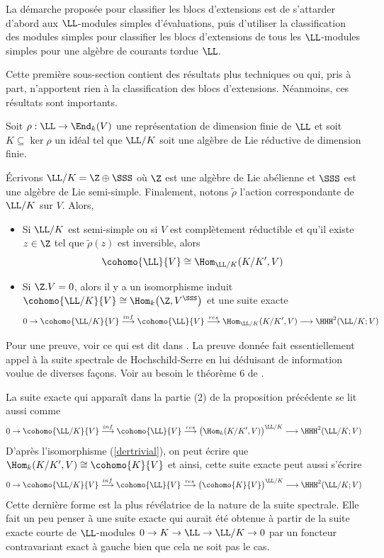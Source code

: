 La démarche proposée pour classifier les blocs d'extensions est de s'attarder d'abord aux $\LL$-modules simples d'évaluations, puis d'utiliser la classification des modules simples pour classifier les blocs d'extensions de tous les $\LL$-modules simples pour une algèbre de courants tordue $\LL$.

Cette première sous-section contient des résultats plus techniques ou qui, pris à part, n'apportent rien à la classification des blocs d'extensions. Néanmoins, ces résultats sont importants.  

\begin{Prop} \label{suitespectrale} Soit $\rho : \LL \rightarrow \End_k(V)$ une représentation de dimension finie de $\LL$ et soit $K \subseteq \ker \rho$ un idéal tel que $\LL/K$ soit une algèbre de Lie réductive de dimension finie. 

Écrivons $\LL/K = \Z \oplus \SSS$ où $\Z$ est une algèbre de Lie abélienne et $\SSS$ est une algèbre de Lie semi-simple. Finalement, notons $\tilde{\rho}$ l'action correspondante de $\LL/K$ sur $V$. Alors,

\begin{itemize}
\item[\em(1)] Si $\LL/K$ est semi-simple ou si $V$ est complètement réductible et qu'il existe $z \in \Z$ tel que $\tilde{\rho}(z)$ est inversible, alors
$$ \cohomo{\LL}{V} \cong \Hom_{\LL/K}(K/K',V) $$
\item[\em(2)] Si $\Z.V = 0$, alors il y a un isomorphisme induit $\cohomo{\LL/K}{V} \cong \Hom_k\big(\Z,V^\SSS\big)$ et une suite exacte
$$ 0 \rightarrow \cohomo{\LL/K}{V} \stackrel{inf}{\longrightarrow} \cohomo{\LL}{V} \stackrel{res}{\longrightarrow} \Hom_{\LL/K}(K/K',V) \longrightarrow \HHH^2(\LL/K;V) $$
\end{itemize}
\end{Prop}

Pour une preuve, voir ce qui est dit dans \cite{NSext}. La preuve donnée fait essentiellement appel à la suite spectrale de Hochschild-Serre en lui déduisant de information voulue de diverses façons. Voir au besoin le théorème 6 de \cite{HSlie}.

\begin{Rem} La suite exacte qui apparaît dans la partie (2) de la proposition précédente se lit aussi comme
$$ 0 \rightarrow \cohomo{\LL/K}{V} \stackrel{inf}{\longrightarrow} \cohomo{\LL}{V} \stackrel{res}{\longrightarrow} \big(\Hom_k(K/K',V)\big)^{\LL/K} \longrightarrow \HHH^2(\LL/K;V) $$
D'après l'isomorphisme (\ref{dertrivial}), on peut écrire que $\Hom_k(K/K',V) \cong \cohomo{K}{V}$ et ainsi, cette suite exacte peut aussi s'écrire
$$ 0 \rightarrow \cohomo{\LL/K}{V} \stackrel{inf}{\longrightarrow} \cohomo{\LL}{V} \stackrel{res}{\longrightarrow} \big(\cohomo{K}{V}\big)^{\LL/K} \longrightarrow \HHH^2(\LL/K;V) $$
Cette dernière forme est la plus révélatrice de la nature de la suite spectrale. Elle fait un peu penser à une suite exacte qui aurait été obtenue à partir de la suite exacte courte de $\LL$-modules $0 \rightarrow K \rightarrow \LL \rightarrow \LL/K \rightarrow 0$ par un foncteur contravariant exact à gauche bien que cela ne soit pas le cas.
\end{Rem}

